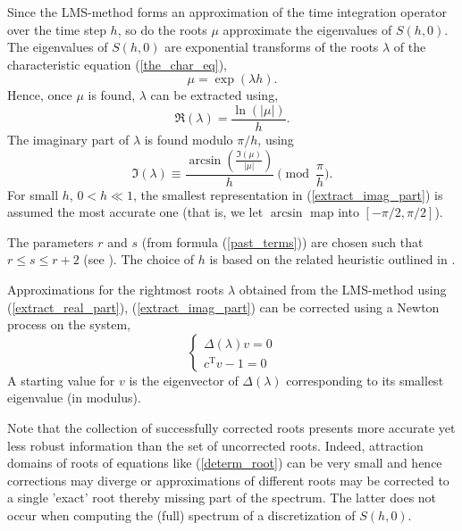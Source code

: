 \documentclass[10pt]{article}
\gdef \T{{\mathrm T}}
\begin{document}
{Since the LMS-method forms an approximation of
the time integration operator over the time step $h$, so do the 
roots $\mu$ approximate the eigenvalues of $S(h,0)$.
The eigenvalues of $S(h,0)$ are exponential transforms of
the roots $\lambda$ of the characteristic 
equation (\ref{the_char_eq}),
\[
\mu=\exp(\lambda h).
\]
Hence, once $\mu$ is found, $\lambda$ can be extracted using,
\begin{equation}\label{extract_real_part}
\Re(\lambda)=\frac{\ln(|\mu|)}{h}.
\end{equation}
The imaginary part of $\lambda$ is found modulo $\pi/h$, using
\begin{equation}\label{extract_imag_part}
\Im(\lambda)\equiv\frac{\arcsin(\frac{\Im(\mu)}{|\mu|})}
{h}\!\!\!\!\pmod{\frac{\pi}{h}}.
\end{equation}
For small $h$, $0<h\ll 1$, the smallest representation 
in (\ref{extract_imag_part})
is assumed the most accurate one (that is, we let $\arcsin$
map into $[-\pi/2,\pi/2]$).

The parameters $r$ and $s$ (from formula (\ref{past_terms}))
are chosen such that $r\leq s\leq r+2$ (see \cite{Hong96}).
The choice of $h$ is based on the related 
heuristic outlined in \cite{engel01}.

Approximations for the rightmost roots $\lambda$ obtained
from the LMS-method using (\ref{extract_real_part}), 
(\ref{extract_imag_part}) can be corrected
using a Newton process on the system,
\begin{equation}\label{determ_root}
\left\{
\begin{array}{l}
\Delta(\lambda)v=0 \\
c^\T v-1=0
\end{array}
\right.
\end{equation}
A starting value for $v$ is the eigenvector of 
$\Delta(\lambda)$ corresponding to its smallest eigenvalue (in modulus).

Note that the collection of successfully corrected roots presents 
more accurate yet less robust information than the set of uncorrected
roots. Indeed, attraction domains of roots of equations 
like (\ref{determ_root})
can be very small and hence
corrections may diverge or
approximations of different roots may be corrected to a single 'exact' root 
thereby missing part of the spectrum.
The latter does not occur when computing the (full) spectrum
of a discretization of $S(h,0)$.

}
\end{document}
